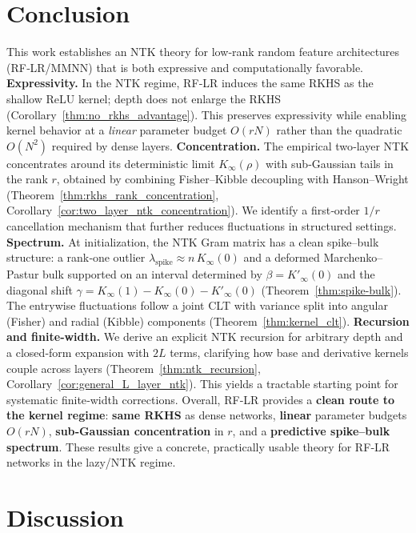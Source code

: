 \section{Conclusion}

This work establishes an NTK theory for low‑rank random feature architectures (RF‑LR/MMNN) that is both expressive and computationally favorable. 
\textbf{Expressivity.} In the NTK regime, RF‑LR induces the same RKHS as the shallow ReLU kernel; depth does not enlarge the RKHS (Corollary~\ref{thm:no_rkhs_advantage}). This preserves expressivity while enabling kernel behavior at a \emph{linear} parameter budget \(O(rN)\) rather than the quadratic \(O(N^2)\) required by dense layers.
\textbf{Concentration.} The empirical two‑layer NTK concentrates around its deterministic limit \(K_\infty(\rho)\) with sub‑Gaussian tails in the rank \(r\), obtained by combining Fisher–Kibble decoupling with Hanson–Wright (Theorem~\ref{thm:rkhs_rank_concentration}, Corollary~\ref{cor:two_layer_ntk_concentration}). We identify a first‑order \(1/r\) cancellation mechanism that further reduces fluctuations in structured settings.
\textbf{Spectrum.} At initialization, the NTK Gram matrix has a clean spike–bulk structure: a rank‑one outlier \(\lambda_{\mathrm{spike}}\approx n\,K_\infty(0)\) and a deformed Marchenko–Pastur bulk supported on an interval determined by \(\beta=K'_\infty(0)\) and the diagonal shift \(\gamma=K_\infty(1)-K_\infty(0)-K'_\infty(0)\) (Theorem~\ref{thm:spike-bulk}). The entrywise fluctuations follow a joint CLT with variance split into angular (Fisher) and radial (Kibble) components (Theorem~\ref{thm:kernel_clt}).
\textbf{Recursion and finite‑width.} We derive an explicit NTK recursion for arbitrary depth and a closed‑form expansion with \(2L\) terms, clarifying how base and derivative kernels couple across layers (Theorem~\ref{thm:ntk_recursion}, Corollary~\ref{cor:general_L_layer_ntk}). This yields a tractable starting point for systematic finite‑width corrections.
Overall, RF‑LR provides a \textbf{clean route to the kernel regime}: \textbf{same RKHS} as dense networks, \textbf{linear} parameter budgets \(O(rN)\), \textbf{sub‑Gaussian concentration} in \(r\), and a \textbf{predictive spike–bulk spectrum}. These results give a concrete, practically usable theory for RF‑LR networks in the lazy/NTK regime.

\section{Discussion}

